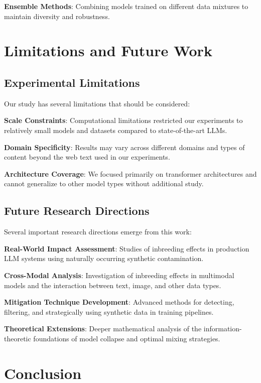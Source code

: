 \documentclass{article}
\begin{document}
\textbf{Ensemble Methods}: Combining models trained on different data mixtures to maintain diversity and robustness.

\section{Limitations and Future Work}

\subsection{Experimental Limitations}

Our study has several limitations that should be considered:

\textbf{Scale Constraints}: Computational limitations restricted our experiments to relatively small models and datasets compared to state-of-the-art LLMs.

\textbf{Domain Specificity}: Results may vary across different domains and types of content beyond the web text used in our experiments.

\textbf{Architecture Coverage}: We focused primarily on transformer architectures and cannot generalize to other model types without additional study.

\subsection{Future Research Directions}

Several important research directions emerge from this work:

\textbf{Real-World Impact Assessment}: Studies of inbreeding effects in production LLM systems using naturally occurring synthetic contamination.

\textbf{Cross-Modal Analysis}: Investigation of inbreeding effects in multimodal models and the interaction between text, image, and other data types.

\textbf{Mitigation Technique Development}: Advanced methods for detecting, filtering, and strategically using synthetic data in training pipelines.

\textbf{Theoretical Extensions}: Deeper mathematical analysis of the information-theoretic foundations of model collapse and optimal mixing strategies.

\section{Conclusion}
\end{document}
